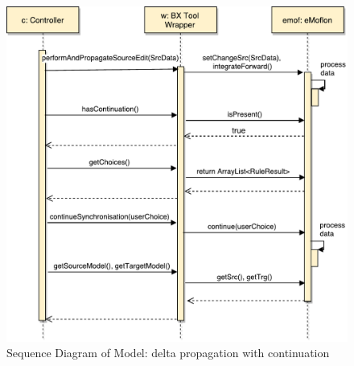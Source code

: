 \begin{figure}
	\centering
	\includegraphics[width=1\textwidth]{figures/Sequence_Diagram-Model(cont-true)}
	\caption{Sequence Diagram of Model: delta propagation with continuation}
	\label{fig:Sequence_Diagram-Model(cont-true)}
\end{figure}

